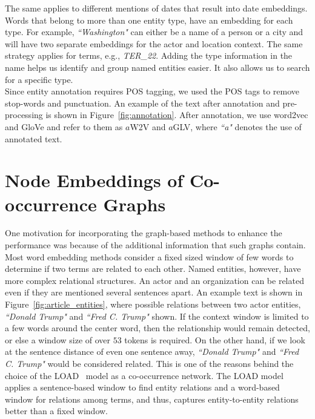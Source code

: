 The same applies to different mentions of dates that result into date embeddings. Words that belong to more than one entity type, have an embedding for each type. For example, \emph{``Washington"} can either be a name of a person or a city and will have two separate embeddings for the actor and location context. The same strategy applies for terms, e.g., \emph{TER\_22}. Adding the type information in the name helps us identify and group named entities easier. It also allows us to search for a specific type. \\
Since entity annotation requires POS tagging, we used the POS tags to remove stop-words and punctuation. An example of the text after annotation and pre-processing is shown in Figure~\ref{fig:annotation}. After annotation, we use word2vec and GloVe and refer to them as $a$W2V and $a$GLV, where \emph{``a"} denotes the use of annotated text. 

\section{Node Embeddings of Co-occurrence Graphs}\label{sec:graph_based}

One motivation for incorporating the graph-based methods to enhance the performance was because of the additional information that such graphs contain. Most word embedding methods consider a fixed sized window of few words to determine if two terms are related to each other. Named entities, however, have more complex relational structures. An actor and an organization can be related even if they are mentioned several sentences apart. An example text is shown in Figure~\ref{fig:article_entities}, where possible relations between two actor entities, \emph{``Donald Trump"} and \emph{``Fred C. Trump"}  shown. If the context window is limited to a few words around the center word, then the relationship would remain detected, or else a window size of over $53$ tokens is required.
On the other hand, if we look at the sentence distance of even one sentence away, \emph{``Donald Trump"} and \emph{``Fred C. Trump"} would be considered related. This is one of the reasons behind the choice of the LOAD~ model as a co-occurrence network. The LOAD model applies a sentence-based window to find entity relations and a word-based window for relations among terms, and thus, captures entity-to-entity relations better than a fixed window.

